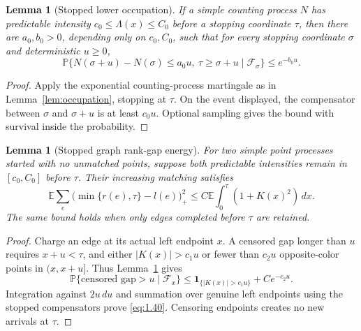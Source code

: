 \documentclass[11pt,reqno]{amsart}
\newtheorem{lemma}[theorem]{Lemma}
\theoremstyle{definition}
\theoremstyle{remark}
\numberwithin{equation}{section}
\newcommand{\E}{\mathbb E}
\newcommand{\Pp}{\mathbb P}
\begin{document}
\begin{lemma}[Stopped lower occupation]
\label{lem:stopped-occ}
If a simple counting process \(N\) has predictable intensity
\(c_0\le\Lambda(x)\le C_0\) before a stopping coordinate \(\tau\), then
there are \(a_0,b_0>0\), depending only on \(c_0,C_0\), such that
for every stopping coordinate \(\sigma\) and deterministic \(u\ge0\),
\begin{equation}
\Pp\{N(\sigma+u)-N(\sigma)\le a_0u,\ \tau\ge\sigma+u
\mid\mathcal F_\sigma\}\le e^{-b_0u}.
\label{eq:1.39a}
\end{equation}
\end{lemma}

\begin{proof}
Apply the exponential counting-process martingale as in
Lemma~\ref{lem:occupation}, stopping at \(\tau\).  On the event displayed,
the compensator between \(\sigma\) and \(\sigma+u\) is at least \(c_0u\).
Optional sampling gives the bound with survival inside the probability.
\end{proof}

\begin{lemma}[Stopped graph rank-gap energy]
\label{lem:rankgap}
For two simple point processes started with no unmatched points, suppose
both predictable intensities remain in \([c_0,C_0]\) before \(\tau\).
Their increasing matching satisfies
\begin{equation}
\E\sum_e\bigl(\min\{r(e),\tau\}-l(e)\bigr)_+^2
\le C\E\int_0^\tau(1+K(x)^2)\,dx.
\label{eq:1.40}
\end{equation}
The same bound holds when only edges completed before \(\tau\) are retained.
\end{lemma}

\begin{proof}
Charge an edge at its actual left endpoint \(x\).  A censored gap longer
than \(u\) requires \(x+u<\tau\), and either \(|K(x)|>c_1u\) or
fewer than \(c_2u\) opposite-color points in \((x,x+u]\).  Thus
Lemma~\ref{lem:stopped-occ} gives
\begin{equation}
\Pp\{\text{censored gap}>u\mid\mathcal F_x\}
\le\mathbf1_{\{|K(x)|>c_1u\}}+Ce^{-c_2u}.
\label{eq:1.41}
\end{equation}
Integration against \(2u\,du\) and summation over genuine left endpoints
using the stopped compensators prove \eqref{eq:1.40}.  Censoring endpoints creates
no new arrivals at \(\tau\).
\end{proof}
\end{document}
